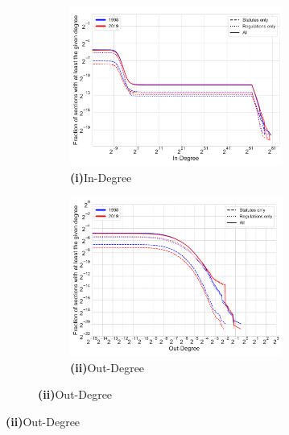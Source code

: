 \documentclass[varwidth, border=0pt]{standalone}
\begin{document}
	
	\begin{figure}
	\centering
\begin{subfigure}{\linewidth}
	\begin{multicols}{2}
		\centering
		\begin{subfigure}{\linewidth}
			\includegraphics[width=\linewidth]{../../graphics/in-degree-us-1998-2019-normalized.pdf}
			\caption*{\textbf{\textsf{(i)}}\quad In-Degree}
		\end{subfigure}
		\newpage
		\begin{subfigure}{\linewidth}
			\includegraphics[width=\linewidth]{../../graphics/out-degree-us-1998-2019-normalized.pdf}
			\caption*{\textbf{\textsf{(ii)}}\quad Out-Degree}
		\end{subfigure}	
	\end{multicols}
	\vspace*{-6pt}
\end{subfigure}


\end{figure}
\end{document}
